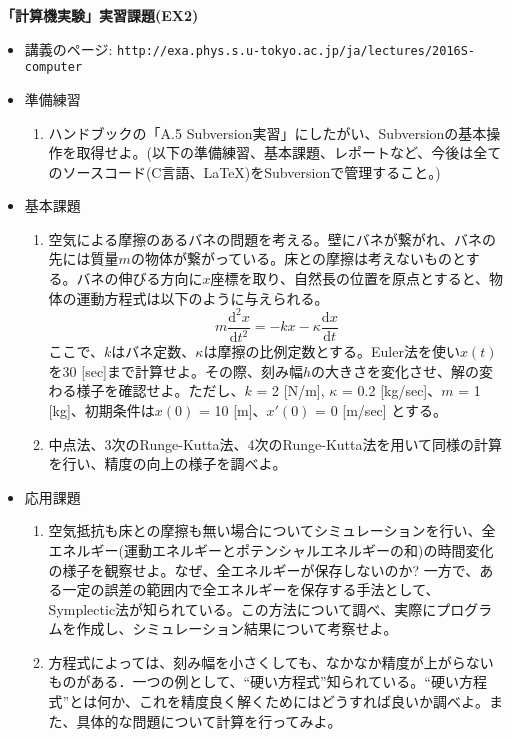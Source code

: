 \documentclass[11pt]{jarticle}
\begin{document}
\noindent
{\bf\large 「計算機実験」実習課題(EX2)}
\\[-0.5em]

\noindent
\begin{itemize}
\item 講義のページ: \verb+http://exa.phys.s.u-tokyo.ac.jp/ja/lectures/2016S-computer+

\item 準備練習
  \begin{enumerate}
  \item ハンドブックの「A.5 Subversion実習」にしたがい、Subversionの基本操作を取得せよ。(以下の準備練習、基本課題、レポートなど、今後は全てのソースコード(C言語、\LaTeX)をSubversionで管理すること。)
  \end{enumerate}

\item 基本課題
  \begin{enumerate}
  \item 空気による摩擦のあるバネの問題を考える。壁にバネが繋がれ、バネの先には質量$m$の物体が繋がっている。床との摩擦は考えないものとする。バネの伸びる方向に$x$座標を取り、自然長の位置を原点とすると、物体の運動方程式は以下のように与えられる。
\[
 m\frac{\mathrm{d} ^2x}{\mathrm{d} t^2} = -kx - \kappa \frac{\mathrm{d} x}{\mathrm{d} t} 
\]
ここで、$k$はバネ定数、$\kappa$は摩擦の比例定数とする。Euler法を使い$x(t)$を30 [sec]まで計算せよ。その際、刻み幅$h$の大きさを変化させ、解の変わる様子を確認せよ。ただし、$k$ = 2 [N/m], $\kappa$ = 0.2 [kg/sec]、$m$ = 1 [kg]、初期条件は$x(0)$ = 10 [m]、$x'(0)$ = 0 [m/sec] とする。
\item 中点法、3次のRunge-Kutta法、4次のRunge-Kutta法を用いて同様の計算を行い、精度の向上の様子を調べよ。
  \end{enumerate}
  
\item 応用課題
  \begin{enumerate}
  \item 空気抵抗も床との摩擦も無い場合についてシミュレーションを行い、全エネルギー(運動エネルギーとポテンシャルエネルギーの和)の時間変化の様子を観察せよ。なぜ、全エネルギーが保存しないのか? 一方で、ある一定の誤差の範囲内で全エネルギーを保存する手法として、Symplectic法が知られている。この方法について調べ、実際にプログラムを作成し、シミュレーション結果について考察せよ。
  \item 方程式によっては、刻み幅を小さくしても、なかなか精度が上がらないものがある．一つの例として、``硬い方程式''知られている。``硬い方程式''とは何か、これを精度良く解くためにはどうすれば良いか調べよ。また、具体的な問題について計算を行ってみよ。
  \end{enumerate}  
\end{itemize}
\end{document}
